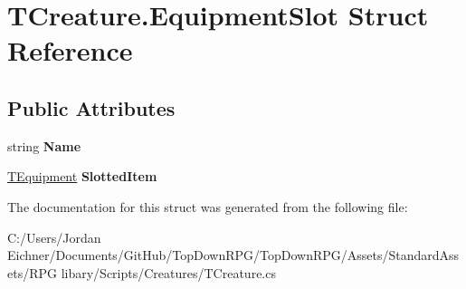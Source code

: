\hypertarget{struct_t_creature_1_1_equipment_slot}{}\section{T\+Creature.\+Equipment\+Slot Struct Reference}
\label{struct_t_creature_1_1_equipment_slot}
\subsection*{Public Attributes}
\begin{DoxyCompactItemize}
\item 
\hypertarget{struct_t_creature_1_1_equipment_slot_a4ce3ee475e08b0977d0fb59bfc60dc86}{}string {\bfseries Name}\label{struct_t_creature_1_1_equipment_slot_a4ce3ee475e08b0977d0fb59bfc60dc86}

\item 
\hypertarget{struct_t_creature_1_1_equipment_slot_aceb771e476871778c0518706dcdbe21d}{}\hyperlink{class_t_equipment}{T\+Equipment} {\bfseries Slotted\+Item}\label{struct_t_creature_1_1_equipment_slot_aceb771e476871778c0518706dcdbe21d}

\end{DoxyCompactItemize}


The documentation for this struct was generated from the following file\+:\begin{DoxyCompactItemize}
\item 
C\+:/\+Users/\+Jordan Eichner/\+Documents/\+Git\+Hub/\+Top\+Down\+R\+P\+G/\+Top\+Down\+R\+P\+G/\+Assets/\+Standard\+Assets/\+R\+P\+G libary/\+Scripts/\+Creatures/T\+Creature.\+cs\end{DoxyCompactItemize}
